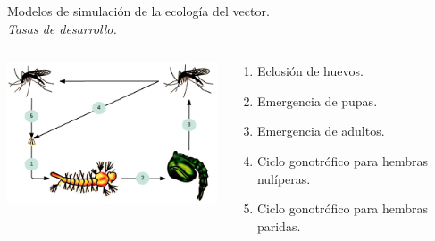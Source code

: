 \begin{frame}[c]{Modelos de simulación de la ecología del vector.\\\textit{Tasas de desarrollo.}}
  \begin{center}
   \begin{columns}[T]
        \begin{column}[T]{6.5cm}
            \includegraphics[width=7cm]{./graphics/tasas-desarrollo.png}
        \end{column}
        \begin{column}[T]{5cm}
          \begin{enumerate}
            \item Eclosión de huevos.
            \item Emergencia de pupas.
            \item Emergencia de adultos.
            \item Ciclo gonotrófico para hembras nulíperas.
            \item Ciclo gonotrófico para hembras paridas.
          \end{enumerate}
        \end{column}
    \end{columns}
  \end{center}
\end{frame}

